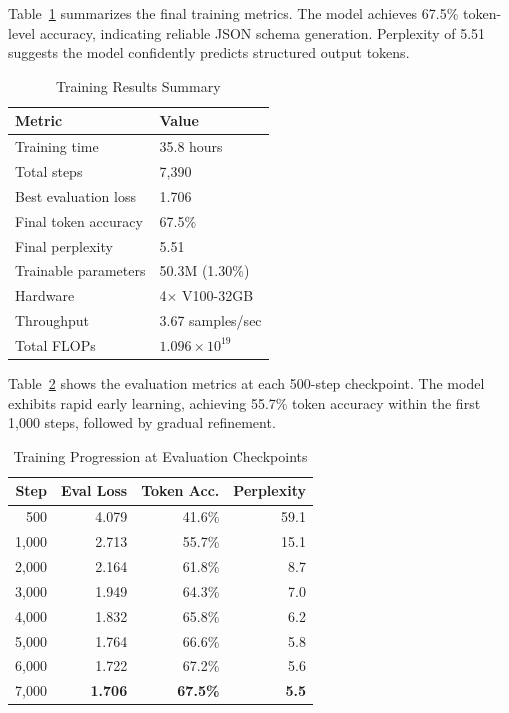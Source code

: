\documentclass[conference]{IEEEtran}
\begin{document}
Table~\ref{tab:training_summary} summarizes the final training metrics. The model achieves 67.5\% token-level accuracy, indicating reliable JSON schema generation. Perplexity of 5.51 suggests the model confidently predicts structured output tokens.

\begin{table}[h]
\caption{Training Results Summary}
\label{tab:training_summary}
\centering
\begin{tabular}{@{}ll@{}}
\toprule
\textbf{Metric} & \textbf{Value} \\
\midrule
Training time & 35.8 hours \\
Total steps & 7,390 \\
Best evaluation loss & 1.706 \\
Final token accuracy & 67.5\% \\
Final perplexity & 5.51 \\
Trainable parameters & 50.3M (1.30\%) \\
Hardware & 4$\times$ V100-32GB \\
Throughput & 3.67 samples/sec \\
Total FLOPs & $1.096 \times 10^{19}$ \\
\bottomrule
\end{tabular}
\end{table}

Table~\ref{tab:checkpoints} shows the evaluation metrics at each 500-step checkpoint. The model exhibits rapid early learning, achieving 55.7\% token accuracy within the first 1,000 steps, followed by gradual refinement.

\begin{table}[h]
\caption{Training Progression at Evaluation Checkpoints}
\label{tab:checkpoints}
\centering
\small
\begin{tabular}{@{}rrrr@{}}
\toprule
\textbf{Step} & \textbf{Eval Loss} & \textbf{Token Acc.} & \textbf{Perplexity} \\
\midrule
500 & 4.079 & 41.6\% & 59.1 \\
1,000 & 2.713 & 55.7\% & 15.1 \\
2,000 & 2.164 & 61.8\% & 8.7 \\
3,000 & 1.949 & 64.3\% & 7.0 \\
4,000 & 1.832 & 65.8\% & 6.2 \\
5,000 & 1.764 & 66.6\% & 5.8 \\
6,000 & 1.722 & 67.2\% & 5.6 \\
7,000 & \textbf{1.706} & \textbf{67.5\%} & \textbf{5.5} \\
\bottomrule
\end{tabular}
\end{table}
\end{document}
